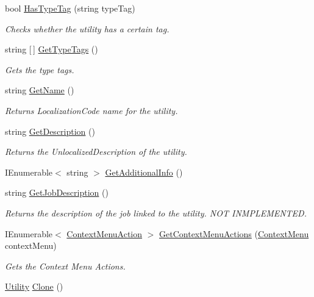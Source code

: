 \begin{DoxyCompactItemize}
bool \hyperlink{class_utility_ac16027b44fefca96cea2491461a7d36c}{Has\+Type\+Tag} (string type\+Tag)
\begin{DoxyCompactList}\small\item\em Checks whether the utility has a certain tag. \end{DoxyCompactList}\item 
string \mbox{[}$\,$\mbox{]} \hyperlink{class_utility_afd1291684c20135877fc55e4bb261199}{Get\+Type\+Tags} ()
\begin{DoxyCompactList}\small\item\em Gets the type tags. \end{DoxyCompactList}\item 
string \hyperlink{class_utility_a3c5c2a1968dfcf083e9b1fa9b843184d}{Get\+Name} ()
\begin{DoxyCompactList}\small\item\em Returns Localization\+Code name for the utility. \end{DoxyCompactList}\item 
string \hyperlink{class_utility_a1571ffbfff4e7b254842e7078e5725e0}{Get\+Description} ()
\begin{DoxyCompactList}\small\item\em Returns the Unlocalized\+Description of the utility. \end{DoxyCompactList}\item 
I\+Enumerable$<$ string $>$ \hyperlink{class_utility_a7b5e30bb3065f9edb004d385019d9c5b}{Get\+Additional\+Info} ()
\item 
string \hyperlink{class_utility_a5689ffa1e6e2d4df20a92fd0a9f24309}{Get\+Job\+Description} ()
\begin{DoxyCompactList}\small\item\em Returns the description of the job linked to the utility. N\+OT I\+N\+M\+P\+L\+E\+M\+E\+N\+T\+ED. \end{DoxyCompactList}\item 
I\+Enumerable$<$ \hyperlink{class_context_menu_action}{Context\+Menu\+Action} $>$ \hyperlink{class_utility_a579c99983d713ac33be085976ef424df}{Get\+Context\+Menu\+Actions} (\hyperlink{class_context_menu}{Context\+Menu} context\+Menu)
\begin{DoxyCompactList}\small\item\em Gets the Context Menu Actions. \end{DoxyCompactList}\item 
\hyperlink{class_utility}{Utility} \hyperlink{class_utility_a54de483d7822530b229a0456780fcc6f}{Clone} ()

\end{DoxyCompactItemize}
